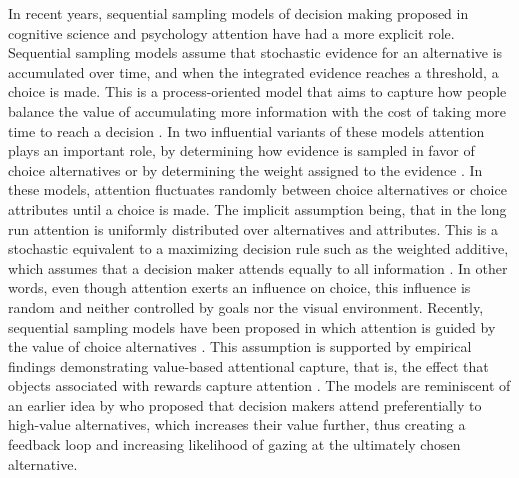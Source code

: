 In recent years, sequential sampling models of decision making proposed in cognitive science and psychology attention have had a more explicit role. Sequential sampling models assume that stochastic evidence for an alternative is accumulated over time, and when the integrated evidence reaches a threshold, a choice is made. This is a process-oriented model that aims to capture how people balance the value of accumulating more information with the cost of taking more time to reach a decision \citep{forstmann2016}. In two influential variants of these models attention plays an important role, by determining how evidence is sampled in favor of choice alternatives \citep{busemeyer1992} or by determining the weight assigned to the evidence \citep{krajbich2010a, thomas2019}. In these models, attention fluctuates randomly between choice alternatives or choice attributes until a choice is made. The implicit assumption being, that in the long run attention is uniformly distributed over alternatives and attributes. This is a stochastic equivalent to a maximizing decision rule such as the weighted additive, which assumes that a decision maker attends equally to all information \cite{gloeckner2011a, payne1988}. In other words, even though attention exerts an influence on choice, this influence is random and neither controlled by goals nor the visual environment. Recently, sequential sampling models have been proposed in which attention is guided by the value of choice alternatives \citep{callaway2019a, gluth2018, gluth2020}. This assumption is supported by empirical findings demonstrating value-based attentional capture, that is, the effect that objects associated with rewards capture attention \citep{lepelley2015}. The models are reminiscent of an earlier idea by \cite{shimojo2003a} who proposed that decision makers attend preferentially to high-value alternatives, which increases their value further, thus creating a feedback loop and increasing likelihood of gazing at the ultimately chosen alternative.\\ 

